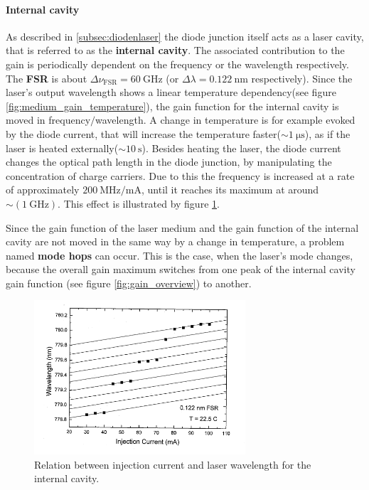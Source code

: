 \paragraph{Internal cavity}
As described in \ref{subsec:diodenlaser} the diode junction itself
acts as a laser cavity, that is referred to as the \textbf{internal cavity}.
The associated contribution to the gain is periodically dependent on
the frequency or the wavelength respectively. The \textbf{FSR} is about
$\Delta\nu_{\text{FSR}} = \SI{60}{\giga\hertz}$ (or
$\Delta\lambda = \SI{0.122}{\nano\meter}$ respectively).
Since the laser's output wavelength shows a linear
temperature dependency(see figure \ref{fig:medium_gain_temperature}),
the gain function for the internal cavity is moved in frequency$/$wavelength.
A change in temperature is for example evoked by the diode current,
that will increase the temperature faster($\sim \SI{1}{\micro\second}$),
as if the laser is heated externally($\sim \SI{10}{\second}$).
Besides heating the laser, the diode current changes the optical
path length in the diode junction, by manipulating the concentration
of charge carriers. Due to this the frequency is increased at a rate of
approximately $\SI{200}{\mega\hertz\per\milli\ampere}$, until it reaches
its maximum at around $\sim(\SI{1}{\giga\hertz})$.
This effect is illustrated by figure \ref{fig:injectioncurrent_wavelength}.


Since the gain function of the laser medium and the gain function of
the internal cavity are not moved in the same way by a change in temperature,
a problem named \textbf{mode hops} can occur. This is the case,
when the laser's mode changes, because the overall gain maximum
switches from one peak of the internal cavity
gain function (see figure \ref{fig:gain_overview}) to another.


\FloatBarrier
\begin{figure}
  \centering
  \includegraphics[width=0.7\textwidth]{injectioncurrent_wavelength.png}
  \caption{Relation between injection current and laser wavelength for the internal cavity.\cite{V60}}
  \label{fig:injectioncurrent_wavelength}
\end{figure}
\FloatBarrier



